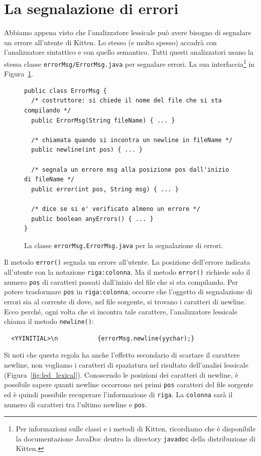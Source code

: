 \section{La segnalazione di errori}\label{sec:errors}
%
Abbiamo appena visto che l'analizzatore lessicale pu\`o avere bisogno
di segnalare un errore all'utente di Kitten. Lo stesso (e molto \piu
spesso) accadr\`a con l'analizzatore sintattico e con quello semantico.
Tutti questi analizzatori usano la stessa classe
\texttt{errorMsg/ErrorMsg.java} per segnalare
errori. La sua interfaccia\footnote{
Per \piu informazioni sulle classi e i metodi di Kitten, ricordiamo
che \`e disponibile la documentazione JavaDoc dentro la
directory \texttt{javadoc} della distribuzione di Kitten.}
\e in Figura~\ref{fig:errorMsg.ErrorMsg}.
%
\begin{figure}[t]
\begin{verbatim}
public class ErrorMsg {
  /* costruttore: si chiede il nome del file che si sta compilando */
  public ErrorMsg(String fileName) { ... }

  /* chiamata quando si incontra un newline in fileName */
  public newline(int pos) { ... }

  /* segnala un errore msg alla posizione pos dall'inizio di fileName */
  public error(int pos, String msg) { ... }

  /* dice se si e' verificato almeno un errore */
  public boolean anyErrors() { ... }
}
\end{verbatim}
\caption{La classe \texttt{errorMsg.ErrorMsg.java} per la segnalazione di errori.}\label{fig:errorMsg.ErrorMsg}
\end{figure}
%
Il metodo \texttt{error()} segnala un errore all'utente. La posizione
dell'errore \e indicata all'utente con la notazione \texttt{riga:colonna}.
Ma il metodo \texttt{error()} richiede solo il numero \texttt{pos}
di caratteri passati dall'inizio del file che si sta compilando.
Per potere trasformare \texttt{pos} in \texttt{riga:colonna}, occorre
che l'oggetto di segnalazione di errori sia al corrente di dove, nel
file sorgente, si trovano i caratteri di newline. Ecco perch\'e, ogni volta
che si incontra tale carattere, l'analizzatore lessicale chiama il
metodo \texttt{newline()}:
%
\begin{verbatim}
  <YYINITIAL>\n           {errorMsg.newline(yychar);}
\end{verbatim}
%
Si noti che questa regola ha anche l'effetto secondario di
scartare il carattere newline, \poiche non vogliamo
i caratteri di spaziatura nel risultato dell'analisi lessicale
(Figura~\ref{fig:led_lexical}). Conoscendo le posizioni dei caratteri
di newline, \`e possibile sapere quanti newline occorrono nei primi
\texttt{pos} caratteri del file sorgente ed \`e quindi possibile
recuperare l'informazione di \texttt{riga}. La \texttt{colonna}
sar\`a il numero di caratteri tra l'ultimo newline e \texttt{pos}.

